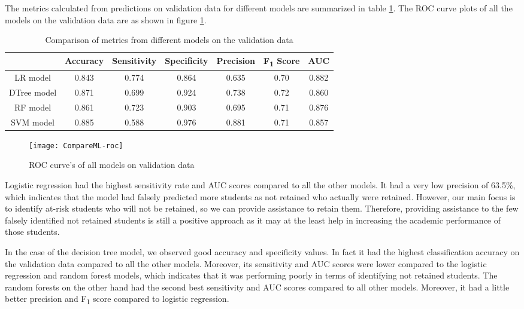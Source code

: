 \documentclass[11pt,openright]{report}
\begin{document}
The metrics calculated from predictions on validation data for different models are summarized in table \ref{table:compare_models_db}. The ROC curve plots of all the models on the validation data are as shown in figure \ref{fig:comparison_roc}.

\begin{table}[!htb]
	\renewcommand{\arraystretch}{1.3}
	\caption{Comparison of metrics from different models on the validation data}
	\label{table:compare_models_db}
	\centering
	\begin{tabular}{|c|c|c|c|c|c|c|}
    \hline
  	 & \bfseries Accuracy & \bfseries Sensitivity & \bfseries Specificity & \bfseries Precision & \bfseries F\textsubscript{1} Score  & \bfseries AUC\\  
    \hline
    	LR model & 0.843 & 0.774 & 0.864 & 0.635 & 0.70 & 0.882 \\ \hline
	DTree model & 0.871 & 0.699 & 0.924 & 0.738 & 0.72 & 0.860 \\ \hline
	RF model & 0.861 & 0.723 & 0.903 & 0.695 & 0.71 & 0.876 \\ \hline
	SVM model & 0.885 & 0.588 & 0.976 & 0.881 & 0.71 & 0.857 \\ \hline
	\end{tabular} 
\end{table}


 \begin{figure}[!htb]
	\centering
	\texttt{[image: CompareML-roc]}
	\caption{ROC curve's of all models on validation data}
	\label{fig:comparison_roc}
\end{figure} 

Logistic regression had the highest sensitivity rate and AUC scores compared to all the other models. It had a very low precision of 63.5\%, which indicates that the model had falsely predicted more students as not retained who actually were retained. However, our main focus is to identify at-risk students who will not be retained, so we can provide assistance to retain them. Therefore, providing assistance to the few falsely identified not retained students is still a positive approach as it may at the least help in increasing the academic performance of those students. 
 
In the case of the decision tree model, we observed good accuracy and specificity values. In fact it had the highest classification accuracy on the validation data compared to all the other models. Moreover, its sensitivity and AUC scores were lower compared to the logistic regression and random forest models, which indicates that it was performing poorly in terms of identifying not retained students. The random forests on the other hand had the second best sensitivity and AUC scores compared to all other models. Moreover, it had a little better precision and F\textsubscript{1} score compared to logistic regression.
\end{document}
